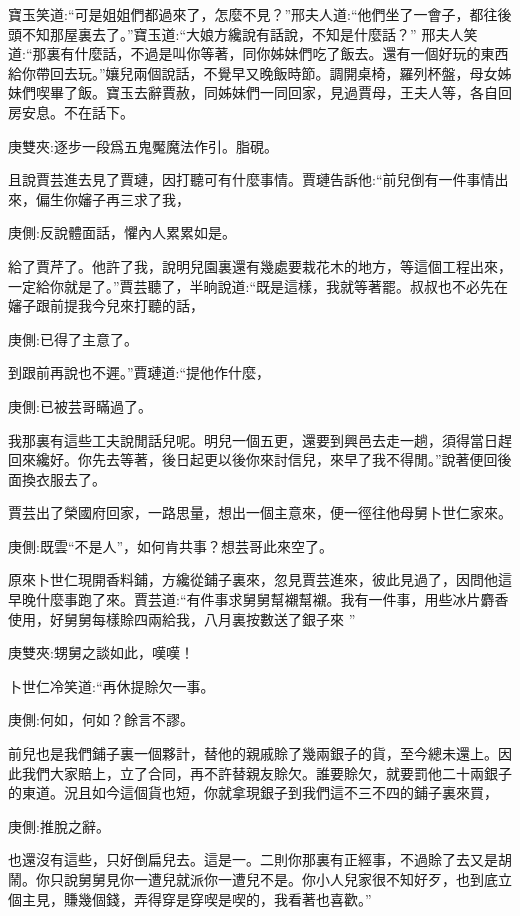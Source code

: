 \begin{parag}
    寶玉笑道:“可是姐姐們都過來了，怎麼不見？”邢夫人道:“他們坐了一會子，都往後頭不知那屋裏去了。”寶玉道:“大娘方纔說有話說，不知是什麼話？” 邢夫人笑道:“那裏有什麼話，不過是叫你等著，同你姊妹們吃了飯去。還有一個好玩的東西給你帶回去玩。”孃兒兩個說話，不覺早又晚飯時節。調開桌椅，羅列杯盤，母女姊妹們喫畢了飯。寶玉去辭賈赦，同姊妹們一同回家，見過賈母，王夫人等，各自回房安息。不在話下。\begin{note}庚雙夾:逐步一段爲五鬼魘魔法作引。脂硯。\end{note}
\end{parag}


\begin{parag}
    且說賈芸進去見了賈璉，因打聽可有什麼事情。賈璉告訴他:“前兒倒有一件事情出來，偏生你嬸子再三求了我，\begin{note}庚側:反說體面話，懼內人累累如是。\end{note}給了賈芹了。他許了我，說明兒園裏還有幾處要栽花木的地方，等這個工程出來，一定給你就是了。”賈芸聽了，半晌說道:“既是這樣，我就等著罷。叔叔也不必先在嬸子跟前提我今兒來打聽的話，\begin{note}庚側:已得了主意了。\end{note}到跟前再說也不遲。”賈璉道:“提他作什麼，\begin{note}庚側:已被芸哥瞞過了。\end{note}我那裏有這些工夫說閒話兒呢。明兒一個五更，還要到興邑去走一趟，須得當日趕回來纔好。你先去等著，後日起更以後你來討信兒，來早了我不得閒。”說著便回後面換衣服去了。
\end{parag}


\begin{parag}
    賈芸出了榮國府回家，一路思量，想出一個主意來，便一徑往他母舅卜世仁家來。\begin{note}庚側:既雲“不是人”，如何肯共事？想芸哥此來空了。\end{note}原來卜世仁現開香料鋪，方纔從鋪子裏來，忽見賈芸進來，彼此見過了，因問他這早晚什麼事跑了來。賈芸道:“有件事求舅舅幫襯幫襯。我有一件事，用些冰片麝香使用，好舅舅每樣賒四兩給我，八月裏按數送了銀子來 ”\begin{note}庚雙夾:甥舅之談如此，嘆嘆！\end{note}卜世仁冷笑道:“再休提賒欠一事。\begin{note}庚側:何如，何如？餘言不謬。\end{note}前兒也是我們鋪子裏一個夥計，替他的親戚賒了幾兩銀子的貨，至今總未還上。因此我們大家賠上，立了合同，再不許替親友賒欠。誰要賒欠，就要罰他二十兩銀子的東道。況且如今這個貨也短，你就拿現銀子到我們這不三不四的鋪子裏來買，\begin{note}庚側:推脫之辭。\end{note}也還沒有這些，只好倒扁兒去。這是一。二則你那裏有正經事，不過賒了去又是胡鬧。你只說舅舅見你一遭兒就派你一遭兒不是。你小人兒家很不知好歹，也到底立個主見，賺幾個錢，弄得穿是穿喫是喫的，我看著也喜歡。”
\end{parag}


